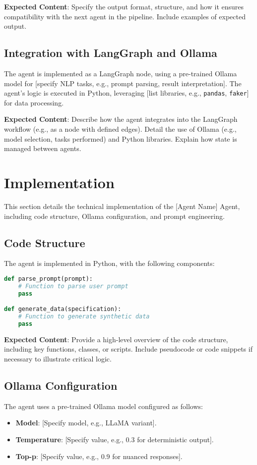 \documentclass{article}
\begin{document}
\textbf{Expected Content}: Specify the output format, structure, and how it ensures compatibility with the next agent in the pipeline. Include examples of expected output.

\subsection{Integration with LangGraph and Ollama}
The agent is implemented as a LangGraph node, using a pre-trained Ollama model for [specify NLP tasks, e.g., prompt parsing, result interpretation]. The agent’s logic is executed in Python, leveraging [list libraries, e.g., \texttt{pandas}, \texttt{faker}] for data processing.

\textbf{Expected Content}: Describe how the agent integrates into the LangGraph workflow (e.g., as a node with defined edges). Detail the use of Ollama (e.g., model selection, tasks performed) and Python libraries. Explain how state is managed between agents.

\section{Implementation}
This section details the technical implementation of the [Agent Name] Agent, including code structure, Ollama configuration, and prompt engineering.

\subsection{Code Structure}
The agent is implemented in Python, with the following components:

\begin{lstlisting}[language=Python, caption=Main Functions]
def parse_prompt(prompt):
    # Function to parse user prompt
    pass

def generate_data(specification):
    # Function to generate synthetic data
    pass
\end{lstlisting}

\textbf{Expected Content}: Provide a high-level overview of the code structure, including key functions, classes, or scripts. Include pseudocode or code snippets if necessary to illustrate critical logic.

\subsection{Ollama Configuration}
The agent uses a pre-trained Ollama model configured as follows:
\begin{itemize}[label=--]
    \item \textbf{Model}: [Specify model, e.g., LLaMA variant].
    \item \textbf{Temperature}: [Specify value, e.g., 0.3 for deterministic output].
    \item \textbf{Top-p}: [Specify value, e.g., 0.9 for nuanced responses].
\end{itemize}
\end{document}
